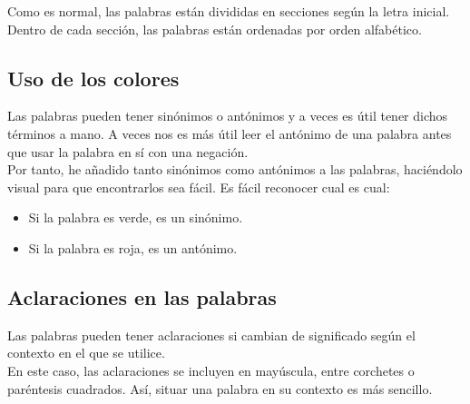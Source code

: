 \documentclass[11pt,a4paper]{article}
\newcommand{\sinonimo}[1]{\textcolor{deepgreen}{#1}}
\newcommand{\antonimo}[1]{\textcolor{deepred}{#1}}
\begin{document}
Como es normal, las palabras están divididas en secciones según la letra inicial. Dentro de cada sección, las palabras están ordenadas por orden alfabético.

\subsection{Uso de los colores}

Las palabras pueden tener sinónimos o antónimos y a veces es útil tener dichos términos a mano. A veces nos es más útil leer el antónimo de una palabra antes que usar la palabra en sí con una negación.\\

Por tanto, he añadido tanto sinónimos como antónimos a las palabras, haciéndolo visual para que encontrarlos sea fácil. Es fácil reconocer cual es cual:

\begin{itemize}
	\item Si la palabra es \sinonimo{verde}, es un \sinonimo{sinónimo}.
	\item Si la palabra es \antonimo{roja}, es un \antonimo{antónimo}.
\end{itemize}

\subsection{Aclaraciones en las palabras}

Las palabras pueden tener aclaraciones si cambian de significado según el contexto en el que se utilice.\\

En este caso, las aclaraciones se incluyen en mayúscula, entre corchetes o paréntesis cuadrados. Así, situar una palabra en su contexto es más sencillo.

\newpage
\end{document}
